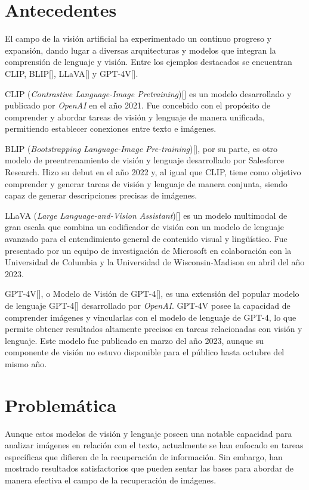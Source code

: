 \section{Antecedentes}
El campo de la visi\'on artificial ha experimentado un continuo progreso y expansi\'on, dando lugar a diversas arquitecturas y modelos que integran la comprensi\'on de lenguaje y visi\'on. Entre los ejemplos destacados se encuentran CLIP, BLIP[\cite{blip}], LLaVA[\cite{llava}] y GPT-4V[\cite{gpt-4v}].

CLIP (\textit{Contrastive Language-Image Pretraining})[\cite{clip-paper}] es un modelo desarrollado y publicado por \textit{OpenAI} en el a\~no 2021. Fue concebido con el prop\'osito de comprender y abordar tareas de visi\'on y lenguaje de manera unificada, permitiendo establecer conexiones entre texto e im\'agenes.

BLIP (\textit{Bootstrapping Language-Image Pre-training})[\cite{blip}], por su parte, es otro modelo de preentrenamiento de visi\'on y lenguaje desarrollado por Salesforce Research. Hizo su debut en el a\~no 2022 y, al igual que CLIP, tiene como objetivo comprender y generar tareas de visi\'on y lenguaje de manera conjunta, siendo capaz de generar descripciones precisas de im\'agenes.

LLaVA (\textit{Large Language-and-Vision Assistant})[\cite{llava}] es un modelo multimodal de gran escala que combina un codificador de visi\'on con un modelo de lenguaje avanzado para el entendimiento general de contenido visual y lingü\'istico. Fue presentado por un equipo de investigaci\'on de Microsoft en colaboraci\'on con la Universidad de Columbia y la Universidad de Wisconsin-Madison en abril del a\~no 2023.

GPT-4V[\cite{gpt-4v}], o Modelo de Visi\'on de GPT-4[\cite{gpt4}], es una extensi\'on del popular modelo de lenguaje GPT-4[\cite{gpt4}] desarrollado por \textit{OpenAI}. GPT-4V posee la capacidad de comprender im\'agenes y vincularlas con el modelo de lenguaje de GPT-4, lo que permite obtener resultados altamente precisos en tareas relacionadas con visi\'on y lenguaje. Este modelo fue publicado en marzo del a\~no 2023, aunque su componente de visi\'on no estuvo disponible para el p\'ublico hasta octubre del mismo a\~no.

\section{Problem\'atica}
Aunque estos modelos de visión y lenguaje poseen una notable capacidad para analizar imágenes en relación con el texto, actualmente se han enfocado en tareas específicas que difieren de la recuperación de información. Sin embargo, han mostrado resultados satisfactorios que pueden sentar las bases para abordar de manera efectiva el campo de la recuperación de imágenes.

